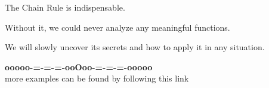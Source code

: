 \documentclass{ximera}
\begin{document}
The Chain Rule is indispensable.

Without it, we could never analyze any meaningful functions.

We will slowly uncover its secrets and how to apply it in any situation.


















\begin{onlineOnly}
\begin{center}
\textbf{\textcolor{green!50!black}{ooooo-=-=-=-ooOoo-=-=-=-ooooo}} \\

more examples can be found by following this link\\ 

\end{center}
\end{onlineOnly}
\end{document}
